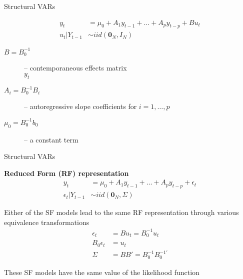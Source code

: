 \documentclass[notes,blackandwhite,mathsans,usenames,dvipsnames]{beamer}
\begin{document}
\begin{frame}{Structural VARs}

\begin{align*}
y_t &= \mu_0 + A_1y_{t-1}+ \dots + A_py_{t-p} + Bu_t\\
u_t|Y_{t-1} &\sim iid(\mathbf{0}_N,I_N)
\end{align*}


\bigskip\begin{description}
\item[$B=B_0^{-1}$] {\color{mcxs2}-- contemporaneous effects matrix} \\

 $y_t$

\item[$A_i=B_0^{-1}B_i$] {\color{mcxs2}-- autoregressive slope coefficients for }$i=1,\dots,p$
\item[$\mu_0=B_0^{-1}b_0$] {\color{mcxs2}-- a constant term}
\end{description}

\end{frame}





\begin{frame}{Structural VARs}

\textbf{Reduced Form (RF) representation}
\begin{align*}
y_t &= \mu_0 + A_1y_{t-1}+ \dots + A_py_{t-p} + \epsilon_t\\
\epsilon_t|Y_{t-1} &\sim iid(\mathbf{0}_N,\Sigma)
\end{align*}

\smallskip\small{\color{mcxs2}Either of the} {\color{purple}SF} {\color{mcxs2}models lead to the same} {\color{purple}RF} {\color{mcxs2}representation through various equivalence transformations}
\begin{align*}
\epsilon_t &= Bu_t = B_0^{-1}u_t \\
B_0\epsilon_t &= u_t \\
\Sigma &= BB' = B_0^{-1}B_0^{-1\prime}
\end{align*}

\smallskip\small{\color{mcxs2}These} {\color{purple}SF} {\color{mcxs2}models have the same value of the likelihood function}

\end{frame}
\end{document}
